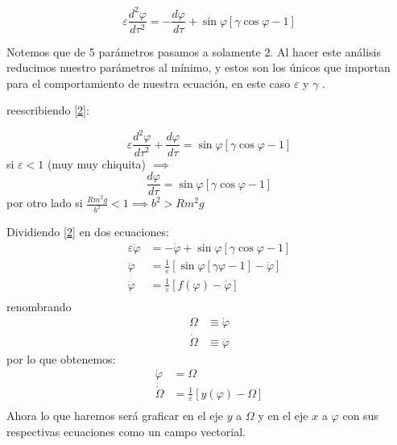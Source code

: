 \begin{equation}\label{2}
  \varepsilon \frac{d^2\varphi}{d\tau^2}=-\frac{d\varphi}{d\tau}+\sin\varphi\left[ \gamma\cos\varphi-1 \right]
\end{equation}

\begin{tcolorbox}[colback=Black!4,colframe=White] 
  \begin{nota}
  Notemos que de 5 parámetros pasamos a solamente 2. Al hacer este análisis reducimos nuestro parámetros al mínimo, y estos son los únicos que importan para el comportamiento de nuestra ecuación, en este caso $\varepsilon$ y $\gamma$ .
\end{nota}
\end{tcolorbox}

reescribiendo \eqref{2}:

\begin{equation}
  \varepsilon \frac{d^2\varphi}{d\tau^2}+\frac{d\varphi}{d\tau}=\sin\varphi \left[ \gamma\cos\varphi-1 \right] 	
\end{equation}
si $\varepsilon<1$ (muy muy chiquita) $\implies$ 
$$
\frac{d\varphi}{d\tau} = \sin\varphi \left[ \gamma\cos\varphi-1 \right] 
$$
por otro lado si $\frac{Rm^2g}{b^2}<1 \implies b^2>Rm^2g$   

Dividiendo \eqref{2} en dos ecuaciones:
$$
\begin{aligned}
  \label{eq:3}
  \varepsilon \ddot{\varphi} &= - \dot{\varphi} + \sin\varphi \left[ \gamma\cos\varphi -1 \right] \\
  \ddot{\varphi} &= \frac{1}{\varepsilon} \left[ \sin\varphi [\gamma\varphi-1]- \dot{\varphi}   \right] \\
  \ddot{\varphi} &= \frac{1}{\varepsilon}[f(\varphi) - \dot{\varphi} ] \\  
\end{aligned} 
$$
renombrando
$$
\begin{aligned}
  \Omega &\equiv \dot{\varphi} \\
  \dot{\Omega} &\equiv \ddot{\varphi}   
\end{aligned}
$$
por lo que obtenemos:
$$
\begin{aligned}
  \dot{\varphi} &= \Omega \\
  \dot{\Omega} &= \frac{1}{\varepsilon}[y(\varphi)-\Omega] \\
\end{aligned}
$$
Ahora lo que haremos será graficar en el eje $y$ a $\Omega$ y en el eje $x$ a $\varphi$ con sus respectivas ecuaciones como un campo vectorial. \\

